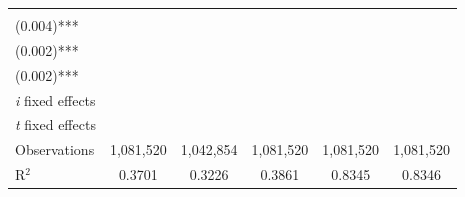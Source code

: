\begin{tabular}{lccccc}
{		} &   & 		\cblock{
			$0.264$
			\\
			\footnotesize{(0.004)***}
		} & 		\cblock{
			$0.422$
			\\
			\footnotesize{(0.002)***}
		} & 		\cblock{
			$0.422$
			\\
			\footnotesize{(0.002)***}
		}
		\\ [0.9em]
		\hline
		\textit{i} fixed effects & \checkmark & \checkmark & \checkmark & ~ & ~
		\\
		\textit{t} fixed effects & \checkmark & \checkmark & ~ & \checkmark & ~
		\\
		Observations & 1,081,520 & 1,042,854 & 1,081,520 & 1,081,520 & 1,081,520
		\\
		R$^2$ & 0.3701 & 0.3226 & 0.3861 & 0.8345 & 0.8346
		\\
		\bottomrule
	\end{tabular}